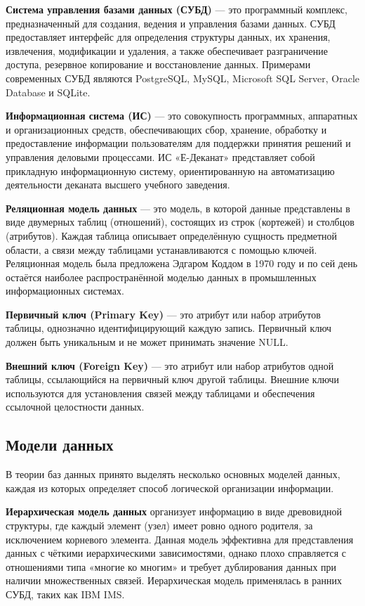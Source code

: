 \documentclass[14pt, a4paper]{extreport}
\begin{document}
\textbf{Система управления базами данных (СУБД)} --- это программный комплекс, предназначенный для создания, ведения и управления базами данных. СУБД предоставляет интерфейс для определения структуры данных, их хранения, извлечения, модификации и удаления, а также обеспечивает разграничение доступа, резервное копирование и восстановление данных. Примерами современных СУБД являются PostgreSQL, MySQL, Microsoft SQL Server, Oracle Database и SQLite.

\textbf{Информационная система (ИС)} --- это совокупность программных, аппаратных и организационных средств, обеспечивающих сбор, хранение, обработку и предоставление информации пользователям для поддержки принятия решений и управления деловыми процессами. ИС «Е-Деканат» представляет собой прикладную информационную систему, ориентированную на автоматизацию деятельности деканата высшего учебного заведения.

\textbf{Реляционная модель данных} --- это модель, в которой данные представлены в виде двумерных таблиц (отношений), состоящих из строк (кортежей) и столбцов (атрибутов). Каждая таблица описывает определённую сущность предметной области, а связи между таблицами устанавливаются с помощью ключей. Реляционная модель была предложена Эдгаром Коддом в 1970 году и по сей день остаётся наиболее распространённой моделью данных в промышленных информационных системах.

\textbf{Первичный ключ (Primary Key)} --- это атрибут или набор атрибутов таблицы, однозначно идентифицирующий каждую запись. Первичный ключ должен быть уникальным и не может принимать значение NULL.

\textbf{Внешний ключ (Foreign Key)} --- это атрибут или набор атрибутов одной таблицы, ссылающийся на первичный ключ другой таблицы. Внешние ключи используются для установления связей между таблицами и обеспечения ссылочной целостности данных.

\subsection{Модели данных}
В теории баз данных принято выделять несколько основных моделей данных, каждая из которых определяет способ логической организации информации.

\textbf{Иерархическая модель данных} организует информацию в виде древовидной структуры, где каждый элемент (узел) имеет ровно одного родителя, за исключением корневого элемента. Данная модель эффективна для представления данных с чёткими иерархическими зависимостями, однако плохо справляется с отношениями типа «многие ко многим» и требует дублирования данных при наличии множественных связей. Иерархическая модель применялась в ранних СУБД, таких как IBM IMS.
\end{document}
